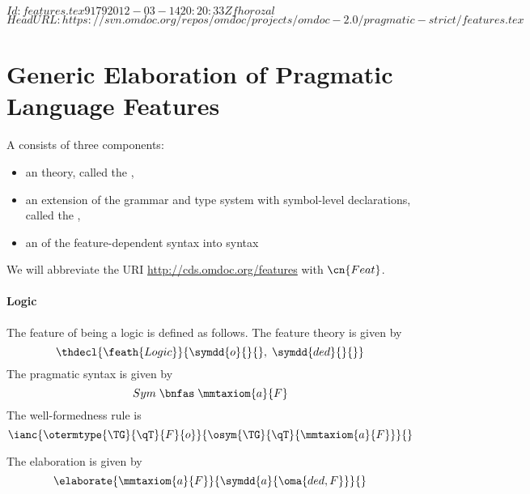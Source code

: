 \svnInfo $Id: features.tex 9179 2012-03-14 20:20:33Z fhorozal $
\svnKeyword $HeadURL: https://svn.omdoc.org/repos/omdoc/projects/omdoc-2.0/pragmatic-strict/features.tex $
\section{Generic Elaboration of Pragmatic Language Features}
 A  consists of three components:
\begin{itemize}
  \item an {\mmt} theory, called the ,
  \item an extension of the {\mmt} grammar and type system with symbol-level declarations, called the ,
  \item an  of the feature-dependent syntax into {\mmt} syntax
\end{itemize}

We will abbreviate the URI \url{http://cds.omdoc.org/features} with $\cn{Feat}$.

\paragraph{Logic}
The feature of being a logic is defined as follows.
The feature theory is given by
\[\thdecl{\feath{Logic}}{\symdd{o}{}{},\;\symdd{ded}{}{}}\]
The pragmatic syntax is given by
\[Sym \;\bnfas\; \mmtaxiom{a}{F}\]
The well-formedness rule is
\[\ianc{\otermtype{\TG}{\qT}{F}{o}}
       {\osym{\TG}{\qT}{\mmtaxiom{a}{F}}}
       {}\]

The elaboration is given by
\[\elaborate{\mmtaxiom{a}{F}}
            {\symdd{a}{\oma{ded,F}}}{}\]

